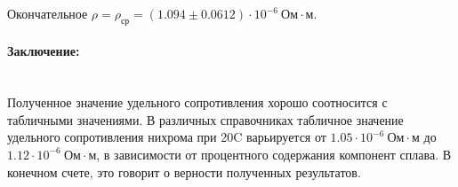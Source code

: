 \documentclass[a4paper, 12pt]{article}
\newcommand{\parag}[1]{\paragraph*{#1:}}
\begin{document}
Окончательное $\rho = \rho_{ср} = (1.094 \pm 0.0612) \cdot 10^{-6} ~ Ом \cdot м$. 

\parag {Заключение} ~\\
Полученное значение удельного сопротивления хорошо соотносится с табличными значениями. В различных справочниках табличное значение удельного сопротивления нихрома при 20\textdegree{}C варьируется от $1.05 \cdot 10^{-6} ~ Ом \cdot м$ до $1.12 \cdot 10^{-6} ~ Ом \cdot м$, в зависимости от процентного содержания компонент сплава. В конечном счете, это говорит о верности полученных результатов.
\end{document}
